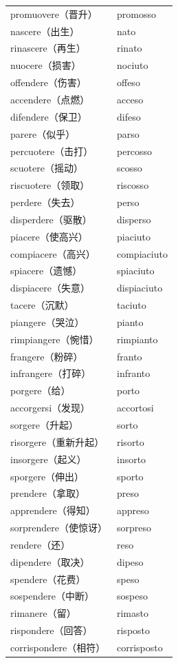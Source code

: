 \documentclass[UTF8,a4paper,titlepage,10pt]{report}
\begin{document}
\begin{enumerate}
\begin{itemize}
\begin{center}
\begin{tabular}{ll}
promuovere（晋升） & promosso\\
nascere（出生） & nato\\
rinascere（再生） & rinato\\
nuocere（损害） & nociuto\\
offendere（伤害） & offeso\\
accendere（点燃） & acceso\\
difendere（保卫） & difeso\\
parere（似乎） & parso\\
percuotere（击打） & percosso\\
scuotere（摇动） & scosso\\
riscuotere（领取） & riscosso\\
perdere（失去） & perso\\
disperdere（驱散） & disperso\\
piacere（使高兴） & piaciuto\\
compiacere（高兴） & compiaciuto\\
spiacere（遗憾） & spiaciuto\\
dispiacere（失意） & dispiaciuto\\
tacere（沉默） & taciuto\\
piangere（哭泣） & pianto\\
rimpiangere（惋惜） & rimpianto\\
frangere（粉碎） & franto\\
infrangere（打碎） & infranto\\
porgere（给） & porto\\
accorgersi（发现） & accortosi\\
sorgere（升起） & sorto\\
risorgere（重新升起） & risorto\\
insorgere（起义） & insorto\\
sporgere（伸出） & sporto\\
prendere（拿取） & preso\\
apprendere（得知） & appreso\\
sorprendere（使惊讶） & sorpreso\\
rendere（还） & reso\\
dipendere（取决） & dipeso\\
spendere（花费） & speso\\
sospendere（中断） & sospeso\\
rimanere（留） & rimasto\\
rispondere（回答） & risposto\\
corrispondere（相符） & corrisposto\\

\end{tabular}
\end{center}
\end{itemize}
\end{enumerate}
\end{document}
